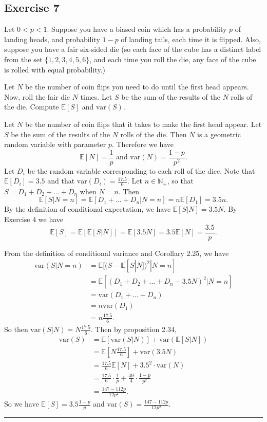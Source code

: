 \documentclass{article}
\theoremstyle{break}
\newenvironment{solution}{{\bf Solution:}}{\hfill\rule{2mm}{2mm}}
\newcommand{\E}{\mathbb{E}}
\newcommand{\var}{\mathrm{var}}
\newcommand{\N}{\mathbb{N}}
\begin{document}
\subsection*{Exercise 7}
Let $0 < p < 1$. Suppose you have a biased coin which has a probability $p$ of landing heads, and probability $1-p$ of landing tails, each time it is flipped. Also, suppose you have a fair six-sided die (so each face of the cube has a distinct label from the set $\{1, 2, 3, 4, 5, 6\}$, and each time you roll the die, any face of the cube is rolled with equal probability.)

Let $N$ be the number of coin flips you need to do until the first head appears. Now, roll the fair die $N$ times. Let $S$ be the sum of the results of the $N$ rolls of the die. Compute $\E[S]$ and $\var(S)$.


\begin{solution}

Let $N$ be the number of coin flips that it takes to make the first head appear. Let $S$ be the sum of the results of the $N$ rolls of the die. Then $N$ is a geometric random variable with parameter $p$. Therefore we have 
\[ \E[N] = \frac{1}{p} \text{ and } \var(N) = \frac{1-p}{p^2}.\]
Let $D_i$ be the random variable corresponding to each roll of the dice. Note that $\E[D_i] = 3.5$ and that $\var(D_i) = \frac{17.5}{6}$. Let $n \in \N_+$, so that $S = D_1 + D_2 + ... + D_n$ when $N = n$. Then 
\[ \E[S | N = n] = \E[D_1 + ... + D_n | N = n] = n \E[D_1] = 3.5n.\]
By the definition of conditional expectation, we have $\E[S | N] = 3.5N$. By Exercise 4 we have 
\[ \E[S] = \E[ \E[ S | N]] = \E[3.5 N] = 3.5 \E[N] = \frac{3.5}{p}.\]

From the definition of conditional variance and Corollary 2.25, we have 
\begin{align*}
\var(S | N = n) &= \E[ (S- \E[S | N])^2 | N = n] \\
	&= \E[ (D_1 + D_2 + ... + D_n - 3.5N)^2 | N = n] \\
	&= \var(D_1 + ... + D_n) \\
	&= n \var(D_1) \\
	&= n \frac{17.5}{6}.
\end{align*}
So then $\var(S | N) = N \frac{17.5}{6}$.
Then by proposition 2.34,
\begin{align*}
\var(S) &= \E[ \var(S | N) ] +  \var( \E[ S  | N ] ) \\
	&= \E[ N \frac{17.5}{6} ]  + \var( 3.5 N ) \\
	&= \frac{17.5}{6} \E[N] + 3.5^2 \cdot \var(N) \\
	&= \frac{17.5}{6} \cdot \frac{1}{p} + \frac{49}{4} \cdot \frac{1-p}{p^2} \\
	&= \frac{147 -112p}{12p^2} .
\end{align*}
So we have $\E[S] = 3.5 \frac{1-p}{p}$ and $\var(S) =  \frac{147 -112p}{12p^2} $.
\end{solution}
\end{document}
